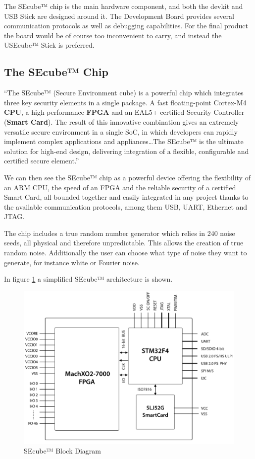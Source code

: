 The SEcube™ chip is the main hardware component, and both the devkit and USB Stick are designed around it. The Development Board provides several communication protocols as well as debugging capabilities. For the final product the board would be of course too inconvenient to carry, and instead the USEcube™ Stick is preferred.

\subsection{The SEcube™ Chip}

``The SEcube™ (Secure Environment cube) is a powerful chip which
integrates three key security elements in a single package. A fast
floating-point Cortex-M4 \textbf{CPU}, a high-performance \textbf{FPGA} and an
EAL5+ certified Security Controller (\textbf{Smart Card}).
The result of this innovative combination gives an extremely
versatile secure environment in a single SoC, in which developers
can rapidly implement complex applications and appliances\dots The SEcube™ is the ultimate solution for high-end design,
delivering integration of a flexible, configurable and certified
secure element.'' \cite{SEcubeDS}

We can then see the SEcube™ chip as a powerful device offering the flexibility of an \textsc{ARM} CPU, the speed of an FPGA and the reliable security of a certified Smart Card, all bounded together and easily integrated in any project thanks to the available communication protocols, among them USB, UART, Ethernet and JTAG. 

The chip includes a true random number generator which relies in 240 noise seeds, all physical and therefore unpredictable. This allows the creation of true random noise. Additionally the user can choose what type of noise they want to generate, for instance white or Fourier noise.

In figure \ref{fig:SEcubeBD} a simplified SEcube™ architecture is shown.

\begin{figure}[ht]
	\centering
	\includegraphics[width=\textwidth]{chapters/figures/development/SEcubeBlocks.png}
	\caption{SEcube™ Block Diagram}
	\label{fig:SEcubeBD}
\end{figure}


